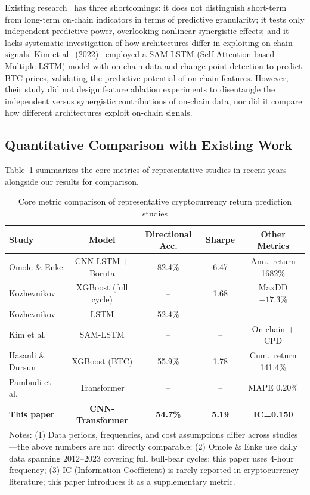 \documentclass[a4paper]{cas-dc}
\begin{document}
Existing research~\cite{corbet2019} has three shortcomings: it does not distinguish short-term from long-term on-chain indicators in terms of predictive granularity; it tests only independent predictive power, overlooking nonlinear synergistic effects; and it lacks systematic investigation of how architectures differ in exploiting on-chain signals. Kim et al.\ (2022)~\cite{kim2022} employed a SAM-LSTM (Self-Attention-based Multiple LSTM) model with on-chain data and change point detection to predict BTC prices, validating the predictive potential of on-chain features. However, their study did not design feature ablation experiments to disentangle the independent versus synergistic contributions of on-chain data, nor did it compare how different architectures exploit on-chain signals.

\subsection{Quantitative Comparison with Existing Work}

Table~\ref{tab:lit_comparison} summarizes the core metrics of representative studies in recent years alongside our results for comparison.

\begin{table}[t]
\centering
\caption{Core metric comparison of representative cryptocurrency return prediction studies}
\label{tab:lit_comparison}
\footnotesize
\begin{tabular}{lcccc}
\toprule
Study & Model & Directional Acc. & Sharpe & Other Metrics \\
\midrule
Omole \& Enke \cite{omole2024} & CNN-LSTM + Boruta & 82.4\% & 6.47 & Ann.\ return 1682\% \\
Kozhevnikov \cite{kozh2025} & XGBoost (full cycle) & -- & 1.68 & MaxDD $-17.3\%$ \\
Kozhevnikov \cite{kozh2025} & LSTM & 52.4\% & -- & -- \\
Kim et al.\ \cite{kim2022} & SAM-LSTM & -- & -- & On-chain + CPD \\
Hasanli \& Dursun \cite{findev2025} & XGBoost (BTC) & 55.9\% & 1.78 & Cum.\ return 141.4\% \\
Pambudi et al.\ \cite{pambudi2025} & Transformer & -- & -- & MAPE 0.20\% \\
\textbf{This paper} & \textbf{CNN-Transformer} & \textbf{54.7\%} & \textbf{5.19} & \textbf{IC=0.150} \\
\bottomrule
\multicolumn{5}{p{0.85\textwidth}}{\footnotesize Notes: (1) Data periods, frequencies, and cost assumptions differ across studies---the above numbers are not directly comparable; (2) Omole \& Enke use daily data spanning 2012--2023 covering full bull-bear cycles; this paper uses 4-hour frequency; (3) IC (Information Coefficient) is rarely reported in cryptocurrency literature; this paper introduces it as a supplementary metric.}
\end{tabular}
\end{table}
\end{document}
